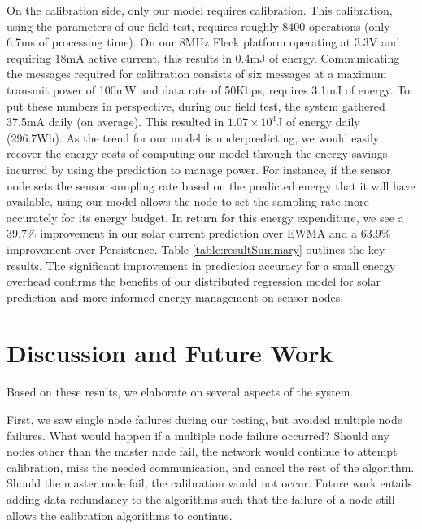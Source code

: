 \documentclass[prodmode,acmtosn]{acmsmall}
\begin{document}
On the calibration side, only our model requires calibration.
This calibration, using the parameters of our field test, requires roughly 8400 operations (only 6.7ms of processing time).
On our 8MHz Fleck platform operating at 3.3V and requiring 18mA active current, this results in 0.4mJ of energy.
Communicating the messages required for calibration consists of six messages at a maximum transmit power of 100mW and data rate of 50Kbps, requires 3.1mJ of energy.
To put these numbers in perspective, during our field test, the system gathered 37.5mA daily (on average).
This resulted in $1.07\times10^{4}$J of energy daily (296.7Wh).
As the trend for our model is underpredicting, we would easily recover the energy costs of computing our model through the energy savings incurred by using the prediction to manage power.
For instance, if the sensor node sets the sensor sampling rate based on the predicted energy that it will have available, using our model allows the node to set the sampling rate more accurately for its energy budget. 
In return for this energy expenditure, we see a $39.7\%$ improvement in our solar current prediction over EWMA and a $63.9\%$ improvement over Persistence.
Table \ref{table:resultSummary} outlines the key results.
The significant improvement in prediction accuracy for a small energy overhead confirms the benefits of our distributed regression model for solar prediction and more informed energy management on sensor nodes. \newline

\begin{table}
\centering
{}
\end{table}

\section{Discussion and Future Work}\label{sec:solar-discuss}
Based on these results, we elaborate on several aspects of the system.

First, we saw single node failures during our testing, but avoided multiple node failures.
What would happen if a multiple node failure occurred?
Should any nodes other than the master node fail, the network would continue to attempt calibration, miss the needed communication, and cancel the rest of the algorithm.
Should the master node fail, the calibration would not occur.
Future work entails adding data redundancy to the algorithms such that the failure of a node still allows the calibration algorithms to continue.
\end{document}
